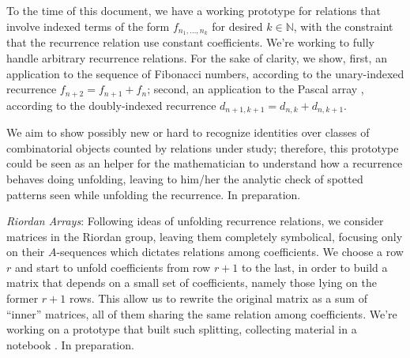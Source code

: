 \documentclass[a4paper]{tufte-handout}
\begin{document}
            To the time of this document, we have a working prototype for relations that involve indexed terms of the
            form $f_{n_{1}, \ldots, n_{k}}$ for desired $k\in\mathbb{N}$, with the constraint that the recurrence relation 
            use constant coefficients. We're working to fully handle arbitrary recurrence relations. For the sake of 
            clarity, we show, first, an application to the sequence of Fibonacci numbers,
            according to the unary-indexed recurrence $f_{n+2}=f_{n+1}+f_{n}$; second, an application to the Pascal array
            ,
            according to the doubly-indexed recurrence $d_{n+1,k+1} = d_{n,k}+d_{n,k+1}$.

            We aim to show possibly new or hard to recognize identities over classes of combinatorial objects counted by
            relations under study; therefore, this prototype could be seen as an helper for the mathematician to understand
            how a recurrence behaves doing unfolding, leaving to him/her the analytic check of spotted patterns seen 
            while unfolding the recurrence. In preparation.

        \item \emph{Riordan Arrays}: Following ideas of unfolding recurrence relations, we consider matrices in the Riordan group,
            leaving them completely symbolical, focusing only on their $A$-sequences which dictates relations among coefficients.
            We choose a row $r$ and start to unfold coefficients from row $r+1$ to the last, in order to build a matrix that 
            depends on a small set of coefficients, namely those lying on the former $r+1$ rows. This allow us to rewrite
            the original matrix as a sum of ``inner'' matrices, all of them sharing the same relation among coefficients.
            We're working on a prototype that built such splitting, collecting material in a notebook
            .
            In preparation.
\end{document}
